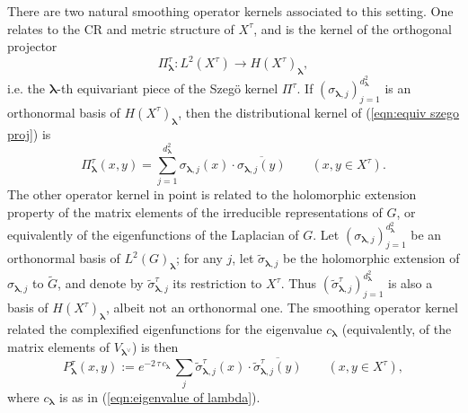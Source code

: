 \documentclass[12pt,a4paper]{article}
\theoremstyle{plain}
\theoremstyle{definition}
\begin{document}
There are two natural smoothing 
operator kernels associated to this
setting. One relates to the CR and
metric structure of $X^\tau$, and is the kernel of the
orthogonal projector 
\begin{equation}
\label{eqn:equiv szego proj}
\Pi^\tau_{\boldsymbol{\lambda}}:L^2(X^\tau)\rightarrow
H(X^\tau)_{\boldsymbol{\lambda}},
\end{equation}
i.e. the $\boldsymbol{\lambda}$-th equivariant piece
of the Szeg\"{o} kernel $\Pi^\tau$. If 
$(
\sigma_{\boldsymbol{\lambda},j}
)_{j=1}^{d_{\boldsymbol{\lambda}}^2}$ is an orthonormal basis of $H(X^\tau)_{\boldsymbol{\lambda}}$, then 
the distributional kernel of (\ref{eqn:equiv szego proj})
is
\begin{equation}
\label{eqn:equiv szego ker}
\Pi^\tau_{\boldsymbol{\lambda}}(x,y)=
\sum_{j=1}^{d_{\boldsymbol{\lambda}}^2}
\sigma_{\boldsymbol{\lambda},j}(x)\cdot 
\overline{\sigma_{\boldsymbol{\lambda},j}(y)}
\qquad (x,y\in X^\tau).
\end{equation}
The other operator kernel in point is related to the
holomorphic extension property of the matrix elements
of the irreducible representations of $G$, or equivalently of the
eigenfunctions of the Laplacian of $G$. Let 
$(
\sigma_{\boldsymbol{\lambda},j}
)_{j=1}^{d_{\boldsymbol{\lambda}}^2}$
be an orthonormal basis of $L^2(G)_{\boldsymbol{\lambda}}$;
for any $j$, let $\tilde{\sigma}_{\boldsymbol{\lambda},j}$
be the holomorphic extension of 
$\sigma_{\boldsymbol{\lambda},j}$ to $\tilde{G}$, and
denote by $\tilde{\sigma}_{\boldsymbol{\lambda},j}^\tau$
its restriction to $X^\tau$. Thus 
$(\tilde{\sigma}_{\boldsymbol{\lambda},j}^\tau)_{j=1}^{d_{\boldsymbol{\lambda}}^2}$ is also a basis of 
$H(X^\tau)_{\boldsymbol{\lambda}}$, albeit not an orthonormal
one.
The smoothing operator kernel related 
the complexified eigenfunctions 
for the eigenvalue $c_{\boldsymbol{\lambda}}$
(equivalently, of the matrix elements of $V_{\boldsymbol{\lambda}^\vee}$)
is then
\begin{equation}
\label{eqn:Poisson-wave equiv}
P^\tau_{\boldsymbol{\lambda}}(x,y):=
e^{-2\,\tau\,c_{\boldsymbol{\lambda}}}\,
\sum_j
\tilde{\sigma}_{\boldsymbol{\lambda},j}^\tau(x)
\cdot \overline{\tilde{\sigma}_{\boldsymbol{\lambda},j}^\tau(y)}
\qquad (x,y\in X^\tau),
\end{equation}
where $c_{\boldsymbol{\lambda}}$ is as in (\ref{eqn:eigenvalue of lambda}).
\end{document}
